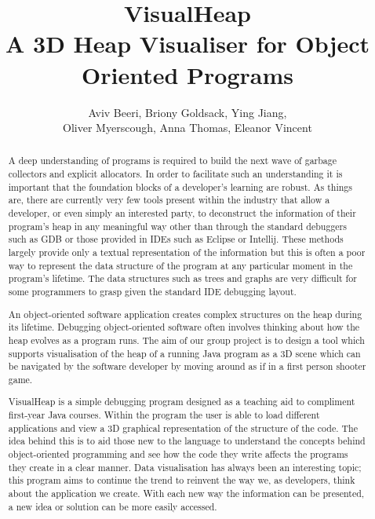 \documentclass[11pt, a4paper]{report}
\begin{document}
\begin{titlepage}

\title{VisualHeap
\\A 3D Heap Visualiser for Object Oriented Programs}
\author{Aviv Beeri, Briony Goldsack, Ying Jiang,
\\Oliver Myerscough, Anna Thomas, Eleanor Vincent}
\maketitle

\end{titlepage}

\tableofcontents

\begin{abstract}
A deep understanding of programs is required to build the next wave of garbage collectors and explicit allocators. In order to facilitate such an understanding it is important that the foundation blocks of a developer’s learning are robust. As things are, there are currently very few tools present within the industry that allow a developer, or even simply an interested party, to deconstruct the information of their program’s heap in any meaningful way other than through the standard debuggers such as GDB or those provided in IDEs such as Eclipse or Intellij. These methods largely provide only a textual representation of the information  but this is often a poor way to represent the data structure of the program at any particular moment in the program’s lifetime. The data structures such as trees and graphs are very difficult for some programmers to grasp given the standard IDE debugging layout. 

An object-oriented software application creates complex structures on the heap during its lifetime. Debugging object-oriented software often involves thinking about how the heap evolves as a program runs. The aim of our group project is to design a tool which supports visualisation of the heap of a running Java program as a 3D scene which can be navigated by the software developer by moving around as if in a first person shooter game.

VisualHeap is a simple debugging program designed as a teaching aid to compliment first-year Java courses. Within the program the user is able to load different applications and view a 3D graphical representation of the structure of the code. The idea behind this is to aid those new to the language to understand the concepts behind object-oriented programming and see how the code they write affects the programs they create in a clear manner. Data visualisation has always been an interesting topic; this program aims to continue the trend to reinvent the way we, as developers, think about the application we create. With each new way the information can be presented, a new idea or solution can be more easily accessed. 


\end{abstract}
\end{document}
